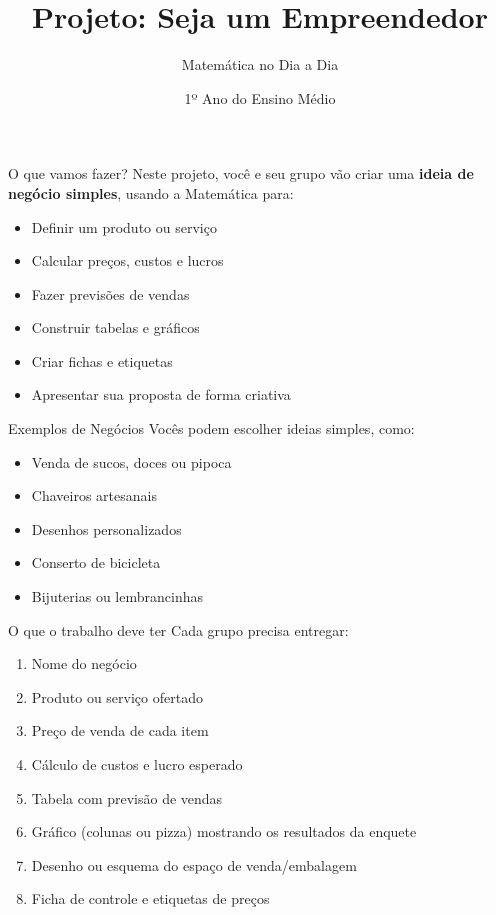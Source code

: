 \documentclass{beamer}
\title{Projeto: Seja um Empreendedor}
\subtitle{Matemática no Dia a Dia}
\author{1º Ano do Ensino Médio}
\date{}
\begin{document}
\begin{frame}
    \titlepage
\end{frame}

\begin{frame}{O que vamos fazer?}
    Neste projeto, você e seu grupo vão criar uma \textbf{ideia de negócio simples}, usando a Matemática para:
    \begin{itemize}
        \item Definir um produto ou serviço
        \item Calcular preços, custos e lucros
        \item Fazer previsões de vendas
        \item Construir tabelas e gráficos
        \item Criar fichas e etiquetas
        \item Apresentar sua proposta de forma criativa
    \end{itemize}
\end{frame}

\begin{frame}{Exemplos de Negócios}
    Vocês podem escolher ideias simples, como:
    \begin{itemize}
        \item Venda de sucos, doces ou pipoca
        \item Chaveiros artesanais
        \item Desenhos personalizados
        \item Conserto de bicicleta
        \item Bijuterias ou lembrancinhas
    \end{itemize}
\end{frame}

\begin{frame}{O que o trabalho deve ter}
    Cada grupo precisa entregar:
    \begin{enumerate}
        \item Nome do negócio
        \item Produto ou serviço ofertado
        \item Preço de venda de cada item
        \item Cálculo de custos e lucro esperado
        \item Tabela com previsão de vendas
        \item Gráfico (colunas ou pizza) mostrando os resultados da enquete
        \item Desenho ou esquema do espaço de venda/embalagem
        \item Ficha de controle e etiquetas de preços
    \end{enumerate}
\end{frame}
\end{document}
